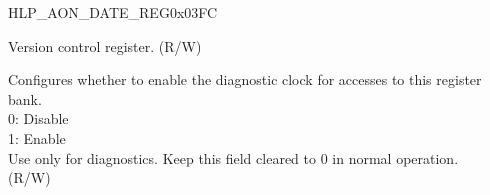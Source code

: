 \begin{register}{H}{LP\_AON\_DATE\_REG}{0x03FC}\label{regdesc:LPAONDATEREG}
%
%
\regnewline%
\begin{regdesc}\begin{reglist}
\label{fielddesc:LPAONDATE}\item [LP\_AON\_DATE] Version control register. (R/W)
\label{fielddesc:LPAONCLKEN}\item [LP\_AON\_CLK\_EN] Configures whether to enable the diagnostic clock for accesses to this register bank.\\
0: Disable\\
1: Enable\\
Use only for diagnostics. Keep this field cleared to 0 in normal operation.\\
(R/W)
\end{reglist}\end{regdesc}
\end{register}

